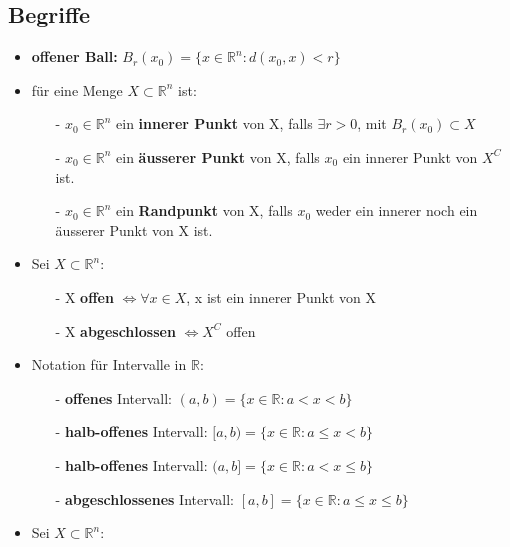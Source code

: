 \documentclass[8pt, a4paper, landscape, fleqn]{scrartcl}
\begin{document}
\begin{multicols*}{3}
		    \subsection{Begriffe}
		        \begin{itemize}
		            \item \textbf{offener Ball:} $B_r(x_0) = \{x \in \mathbb{R}^n : d(x_0,x) < r\}$
		            \item für eine Menge $X\subset \mathbb{R}^n$ ist:
		            \begin{itemize}
		                \item[-] $x_0 \in \mathbb{R}^n$ ein \textbf{innerer Punkt} von X, falls $\exists r > 0$, mit $B_r(x_0) \subset X$
		                \item[-]$x_0 \in \mathbb{R}^n$ ein \textbf{äusserer Punkt} von X, falls $x_0$ ein innerer Punkt von $X^C$ ist.
		                \item[-] $x_0 \in \mathbb{R}^n$ ein \textbf{Randpunkt} von X, falls $x_0$ weder ein innerer noch ein äusserer Punkt von X ist.
		            \end{itemize}
		            \item Sei $X \subset \mathbb{R}^n$:
		            \begin{itemize}
		                \item[-] X \textbf{offen} $\Leftrightarrow \forall x \in X$, x ist ein innerer Punkt von X
		                \item[-] X \textbf{abgeschlossen} $\Leftrightarrow X^C$ offen
		            \end{itemize}
		            \item Notation für Intervalle in $\mathbb{R}$:
		            \begin{itemize}
		                \item[-] \textbf{offenes} Intervall: $(a,b) = \{x \in \mathbb{R}: a<x<b\}$
		                \item[-] \textbf{halb-offenes} Intervall: $[a,b) = \{x \in \mathbb{R}: a\leq x<b\}$
		                \item[-] \textbf{halb-offenes} Intervall: $(a,b] = \{x \in \mathbb{R}: a<x\leq b\}$
		                \item[-] \textbf{abgeschlossenes} Intervall: $[a,b] = \{x \in \mathbb{R}: a\leq x \leq b\}$
		            \end{itemize}
		            \item Sei $X \subset \mathbb{R}^n$:
		            \begin{itemize}

\end{itemize}
\end{itemize}
\end{multicols*}
\end{document}
